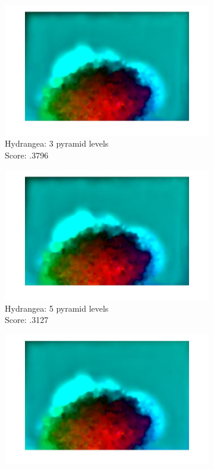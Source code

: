 \documentclass[10pt,twocolumn,letterpaper]{article}
\begin{document}
\begin{figure}[t]
	\centering
	\begin{subfigure}[b]{0.3\textwidth}
		\centering
		\includegraphics[width=\textwidth] {hydragea_3levels.jpg}
		\caption{Hydrangea: 3 pyramid levels \\ Score: .3796}
		\label{fig:hydragea3}
	\end{subfigure}\hfill
	\begin{subfigure}[b]{0.3\textwidth}
		\centering
		\includegraphics[width=\textwidth] {hydragea_5levels.jpg} 
		\caption{Hydrangea: 5 pyramid levels \\ Score: .3127}
		\label{fig:hydrangea5}
	\end{subfigure}\hfill
	\begin{subfigure}[b]{0.3\textwidth}
		\centering
		\includegraphics[width=\textwidth] {hydragea_6levels.jpg} 

\end{subfigure}
\end{figure}
\end{document}
